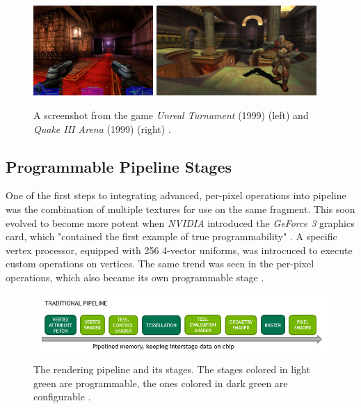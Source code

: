 \begin{figure}[h]
    \centering
    \includegraphics[width=172.5px]{images/graphics/unreal-turnament.jpg}
    \includegraphics[width=230px]{images/graphics/quake-iii-arena.jpg}
    \caption{A screenshot from the game \emph{Unreal Turnament} (1999) (left) and \emph{Quake III Arena} (1999) 
    (right) \cite{GamespotUnrealTurnament, GameWatcher2006}.}
    \label{fig:unreal-turnament-quake-arena}
\end{figure}


\subsection*{Programmable Pipeline Stages}
 
One of the first steps to integrating advanced, per-pixel operations into pipeline was the combination of
multiple textures for use on the same fragment. This soon evolved to become more potent when \emph{NVIDIA} 
introduced the \emph{GeForce 3} graphics card, which "contained the first example of true programmability" 
\cite{KhronosProgramibility2024}. A specific vertex processor, equipped with 256 4-vector uniforms, was 
introcuced to execute custom operations on vertices. The same trend was seen in the per-pixel operations, 
which also became its own programmable stage \cite{KhronosProgramibility2024}. \\

\begin{figure}[h]
    \centering
    \includegraphics[width=\linewidth]{images/graphics/traditional-rendering-pipeline.jpg}
    \caption{The rendering pipeline and its stages. The stages colored in light green are programmable, 
    the ones colored in dark green are configurable \cite{Kubisch2018}.}
    \label{fig:traditional-rendering-pipeline}
\end{figure}


